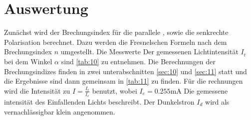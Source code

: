 \section{Auswertung}
\label{sec:Auswertung}

Zunächst wird der Brechungsindex für die parallele , sowie die senkrechte
Polarisation berechnet. Dazu werden die Fresnelschen Formeln nach dem 
Brechungsindex $n$ umgestellt. Die Messwerte Der gemessenen Lichtintensität $I_\text{r}$
bei dem Winkel $\alpha$ sind \autoref{tab:10}  zu entnehmen. Die Berechnungen der Brechungsindizes 
finden in zwei unterabschnitten \autoref{sec:10} und \autoref{sec:11} statt und die Ergebnisse sind 
dann gemeinsam in \autoref{tab:11} zu finden. Für die rechnungen wird die Intensität zu $I = \frac{I_r}{I_e}$ 
benutzt, wobei $I_e = 0.255\unit{\milli\ampere}$  Die gemessene intensität des Einfallenden Lichts beschreibt.
Der Dunkelstron $I_d$ wird als vernachlässigbar klein angenommen. 

